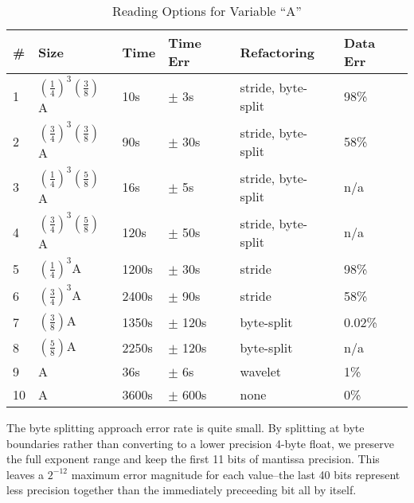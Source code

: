 \begin{table}[tbp]
\centering
\caption{Reading Options for Variable ``A''}
\label{tab:results}
\begin{tabular}{|l|l|l|l|l|l|}
\hline
\# & Size & Time & Time Err & Refactoring & Data Err\\
\hline
1 & $(\frac{1}{4})^3(\frac{3}{8})$A & 10s & $\pm$ 3s & stride, byte-split & 98\% \\
\hline
2 & $(\frac{3}{4})^3(\frac{3}{8})$A & 90s & $\pm$ 30s & stride, byte-split & 58\% \\
\hline
3 & $(\frac{1}{4})^3(\frac{5}{8})$A & 16s & $\pm$ 5s & stride, byte-split & n/a \\
\hline
4 & $(\frac{3}{4})^3(\frac{5}{8})$A & 120s & $\pm$ 50s & stride, byte-split & n/a \\
\hline
\hline
5 & $(\frac{1}{4})^3$A & 1200s & $\pm$ 30s & stride & 98\% \\
\hline
6 & $(\frac{3}{4})^3$A & 2400s & $\pm$ 90s & stride & 58\% \\
\hline
\hline
7 & $(\frac{3}{8})$A & 1350s & $\pm$ 120s & byte-split & 0.02\% \\
\hline
8 & $(\frac{5}{8})$A & 2250s & $\pm$ 120s & byte-split & n/a \\
\hline
\hline
9 & A & 36s & $\pm$ 6s & wavelet & 1\% \\
\hline
\hline
10 & A & 3600s & $\pm$ 600s & none & 0\% \\
\hline
\end{tabular}
\end{table}

The byte splitting approach error rate is quite small. By splitting at byte
boundaries rather than converting to a lower precision 4-byte float, we
preserve the full exponent range and keep the first 11 bits of mantissa
precision. This leaves a $2^{-12}$ maximum error magnitude for each value--the
last 40 bits represent less precision together than the immediately preceeding
bit all by itself.


